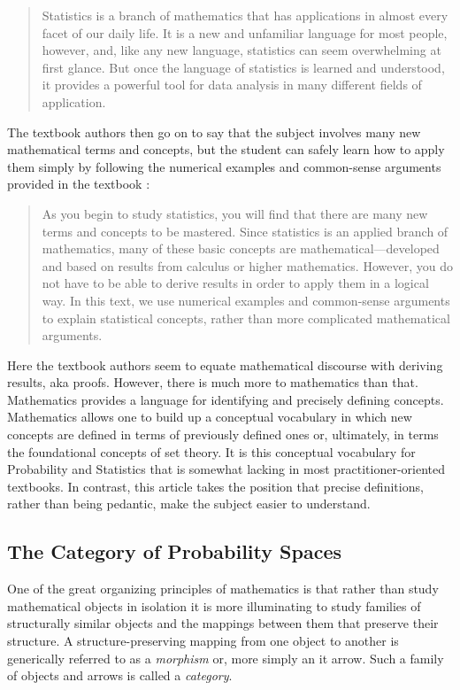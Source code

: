 \documentclass{article}
\begin{document}
\begin{quotation}
Statistics is a branch of mathematics that has applications in almost every facet of our daily life. It is a new and unfamiliar language for most people, however, and, like any new language, statistics can seem overwhelming at first glance. But once the language of statistics is learned and understood, it provides a powerful tool for data analysis in many different fields of application.
\end{quotation}

The textbook authors then go on to say that the subject involves many new mathematical terms and concepts, 
but the student can safely learn how to apply them simply
by following the numerical examples and common-sense arguments provided in the textbook \cite[p5]{mendenhall:ips14}:

\begin{quotation}
As you begin to study statistics, you will find that there are many new terms and concepts to be mastered. Since statistics is an applied branch of mathematics, many of these basic concepts are mathematical---developed and based on results from calculus or higher mathematics. However, you do not have to be able to derive results in order to apply them in a logical way. In this text, we use numerical examples and common-sense arguments to explain statistical concepts, rather than more complicated mathematical arguments.
\end{quotation}

Here the textbook authors seem to equate mathematical discourse with deriving results, aka proofs.
However, there is much more to mathematics than that.
Mathematics provides a language for identifying and precisely defining concepts.
Mathematics allows one to build up a conceptual vocabulary in which new concepts are defined in terms of previously defined ones
or, ultimately, in terms the foundational concepts of set theory.
It is this conceptual vocabulary for Probability and Statistics that is somewhat lacking in most practitioner-oriented textbooks.
In contrast, this article takes the position that precise definitions, rather than being pedantic, make the subject easier to understand.

\subsection{The Category of Probability Spaces}

One of the great organizing principles of mathematics is that rather than study mathematical objects in isolation it is more illuminating to study 
families of structurally similar objects and the mappings between them that preserve their structure.
A structure-preserving mapping from one object to another is generically referred to as a {\it morphism} or, more simply an {it arrow}.
Such a family of objects and arrows is called a {\it category}.
\end{document}
